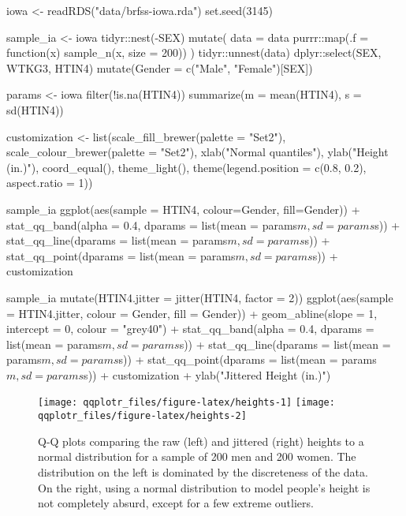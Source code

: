 
\begin{Schunk}
\begin{Sinput}
iowa <- readRDS("data/brfss-iowa.rda")
set.seed(3145)

sample_ia <- iowa %>% 
  tidyr::nest(-SEX) %>% 
  mutate(
    data = data %>% 
    purrr::map(.f = function(x) sample_n(x, size = 200))
    ) %>% 
  tidyr::unnest(data) %>% 
  dplyr::select(SEX, WTKG3, HTIN4) %>%
  mutate(Gender = c("Male", "Female")[SEX])

params <- iowa %>% 
  filter(!is.na(HTIN4)) %>% 
  summarize(m = mean(HTIN4), s = sd(HTIN4))

customization <- list(scale_fill_brewer(palette = "Set2"),
                      scale_colour_brewer(palette = "Set2"),
                      xlab("Normal quantiles"),
                      ylab("Height (in.)"),
                      coord_equal(),
                      theme_light(),
                      theme(legend.position = c(0.8, 0.2), aspect.ratio = 1))

sample_ia %>% 
  ggplot(aes(sample = HTIN4, colour=Gender, fill=Gender)) + 
  stat_qq_band(alpha = 0.4,
               dparams = list(mean = params$m, sd = params$s)) + 
  stat_qq_line(dparams = list(mean = params$m, sd = params$s)) + 
  stat_qq_point(dparams = list(mean = params$m, sd = params$s)) +
  customization

sample_ia %>% 
  mutate(HTIN4.jitter = jitter(HTIN4, factor = 2)) %>% 
  ggplot(aes(sample = HTIN4.jitter, colour = Gender, fill = Gender)) + 
  geom_abline(slope = 1, intercept = 0, colour = "grey40") +
  stat_qq_band(alpha = 0.4,
               dparams = list(mean = params$m, sd = params$s)) +
  stat_qq_line(dparams = list(mean = params$m, sd = params$s)) + 
  stat_qq_point(dparams = list(mean = params$m, sd = params$s)) +
  customization +
  ylab("Jittered Height (in.)") 
\end{Sinput}
\begin{figure}

{\centering \texttt{[image: qqplotr\_files/figure-latex/heights-1]} \texttt{[image: qqplotr\_files/figure-latex/heights-2]} 

}

\caption[Q-Q plots comparing the raw (left) and jittered (right) heights to a normal distribution for a sample of 200 men and 200 women]{Q-Q plots comparing the raw (left) and jittered (right) heights to a normal distribution for a sample of 200 men and 200 women. The distribution on the left is dominated by the discreteness of the data. On the right, using a normal distribution to model people's height is not completely absurd, except for a few extreme outliers.}\label{fig:heights}
\end{figure}
\end{Schunk}

